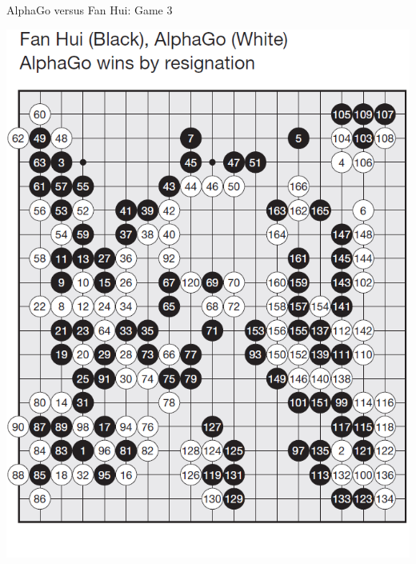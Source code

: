 \documentclass{beamer}
\begin{document}
{    \begin{frame}{AlphaGo versus Fan Hui: Game 3}
      \begin{center}
        \includegraphics[height=.9\textheight]{../img/AlphaGo_vs_Fan_Hui_Game_3.png}
      \end{center}
    \end{frame}

}
\end{document}
